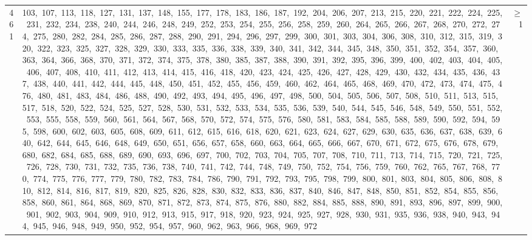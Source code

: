 \begin{longtable}{c|p{}|r}
461 & 103,\ 107,\ 113,\ 118,\ 127,\ 131,\ 137,\ 148,\ 155,\ 177,\ 178,\ 183,\ 186,\ 187,\ 192,\ 204,\ 206,\ 207,\ 213,\ 215,\ 220,\ 221,\ 222,\ 224,\ 225,\ 231,\ 232,\ 234,\ 238,\ 240,\ 244,\ 246,\ 248,\ 249,\ 252,\ 253,\ 254,\ 255,\ 256,\ 258,\ 259,\ 260,\ 264,\ 265,\ 266,\ 267,\ 268,\ 270,\ 272,\ 274,\ 275,\ 280,\ 282,\ 284,\ 285,\ 286,\ 287,\ 288,\ 290,\ 291,\ 294,\ 296,\ 297,\ 299,\ 300,\ 301,\ 303,\ 304,\ 306,\ 308,\ 310,\ 312,\ 315,\ 319,\ 320,\ 322,\ 323,\ 325,\ 327,\ 328,\ 329,\ 330,\ 333,\ 335,\ 336,\ 338,\ 339,\ 340,\ 341,\ 342,\ 344,\ 345,\ 348,\ 350,\ 351,\ 352,\ 354,\ 357,\ 360,\ 363,\ 364,\ 366,\ 368,\ 370,\ 371,\ 372,\ 374,\ 375,\ 378,\ 380,\ 385,\ 387,\ 388,\ 390,\ 391,\ 392,\ 395,\ 396,\ 399,\ 400,\ 402,\ 403,\ 404,\ 405,\ 406,\ 407,\ 408,\ 410,\ 411,\ 412,\ 413,\ 414,\ 415,\ 416,\ 418,\ 420,\ 423,\ 424,\ 425,\ 426,\ 427,\ 428,\ 429,\ 430,\ 432,\ 434,\ 435,\ 436,\ 437,\ 438,\ 440,\ 441,\ 442,\ 444,\ 445,\ 448,\ 450,\ 451,\ 452,\ 455,\ 456,\ 459,\ 460,\ 462,\ 464,\ 465,\ 468,\ 469,\ 470,\ 472,\ 473,\ 474,\ 475,\ 476,\ 480,\ 481,\ 483,\ 484,\ 486,\ 488,\ 490,\ 492,\ 493,\ 494,\ 495,\ 496,\ 497,\ 498,\ 500,\ 504,\ 505,\ 506,\ 507,\ 508,\ 510,\ 511,\ 513,\ 515,\ 517,\ 518,\ 520,\ 522,\ 524,\ 525,\ 527,\ 528,\ 530,\ 531,\ 532,\ 533,\ 534,\ 535,\ 536,\ 539,\ 540,\ 544,\ 545,\ 546,\ 548,\ 549,\ 550,\ 551,\ 552,\ 553,\ 555,\ 558,\ 559,\ 560,\ 561,\ 564,\ 567,\ 568,\ 570,\ 572,\ 574,\ 575,\ 576,\ 580,\ 581,\ 583,\ 584,\ 585,\ 588,\ 589,\ 590,\ 592,\ 594,\ 595,\ 598,\ 600,\ 602,\ 603,\ 605,\ 608,\ 609,\ 611,\ 612,\ 615,\ 616,\ 618,\ 620,\ 621,\ 623,\ 624,\ 627,\ 629,\ 630,\ 635,\ 636,\ 637,\ 638,\ 639,\ 640,\ 642,\ 644,\ 645,\ 646,\ 648,\ 649,\ 650,\ 651,\ 656,\ 657,\ 658,\ 660,\ 663,\ 664,\ 665,\ 666,\ 667,\ 670,\ 671,\ 672,\ 675,\ 676,\ 678,\ 679,\ 680,\ 682,\ 684,\ 685,\ 688,\ 689,\ 690,\ 693,\ 696,\ 697,\ 700,\ 702,\ 703,\ 704,\ 705,\ 707,\ 708,\ 710,\ 711,\ 713,\ 714,\ 715,\ 720,\ 721,\ 725,\ 726,\ 728,\ 730,\ 731,\ 732,\ 735,\ 736,\ 738,\ 740,\ 741,\ 742,\ 744,\ 748,\ 749,\ 750,\ 752,\ 754,\ 756,\ 759,\ 760,\ 762,\ 765,\ 767,\ 768,\ 770,\ 774,\ 775,\ 776,\ 777,\ 779,\ 780,\ 782,\ 783,\ 784,\ 786,\ 790,\ 791,\ 792,\ 793,\ 795,\ 798,\ 799,\ 800,\ 801,\ 803,\ 804,\ 805,\ 806,\ 808,\ 810,\ 812,\ 814,\ 816,\ 817,\ 819,\ 820,\ 825,\ 826,\ 828,\ 830,\ 832,\ 833,\ 836,\ 837,\ 840,\ 846,\ 847,\ 848,\ 850,\ 851,\ 852,\ 854,\ 855,\ 856,\ 858,\ 860,\ 861,\ 864,\ 868,\ 869,\ 870,\ 871,\ 872,\ 873,\ 874,\ 875,\ 876,\ 880,\ 882,\ 884,\ 885,\ 888,\ 890,\ 891,\ 893,\ 896,\ 897,\ 899,\ 900,\ 901,\ 902,\ 903,\ 904,\ 909,\ 910,\ 912,\ 913,\ 915,\ 917,\ 918,\ 920,\ 923,\ 924,\ 925,\ 927,\ 928,\ 930,\ 931,\ 935,\ 936,\ 938,\ 940,\ 943,\ 944,\ 945,\ 946,\ 948,\ 949,\ 950,\ 952,\ 954,\ 957,\ 960,\ 962,\ 963,\ 966,\ 968,\ 969,\ 972 & $\ge$ 1 \\

\end{longtable}
